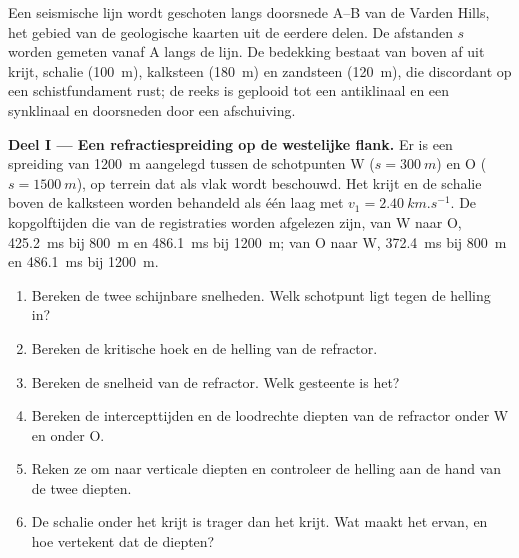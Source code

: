 \begin{problem}
\label{pb:b3:exploration-seismology:1}
Een seismische lijn wordt geschoten langs doorsnede A--B van de Varden Hills, het gebied van
de geologische kaarten uit de eerdere delen. De afstanden $s$ worden gemeten vanaf
A langs de lijn. De bedekking bestaat van boven af uit krijt, schalie (\qty{100}{m}),
kalksteen (\qty{180}{m}) en zandsteen (\qty{120}{m}), die discordant op een
schistfundament rust; de reeks is geplooid tot een antiklinaal en een synklinaal en doorsneden door een
afschuiving.

\medskip
\noindent\textbf{Deel I --- Een refractiespreiding op de westelijke flank.} Er is een spreiding van
\qty{1200}{m} aangelegd tussen de schotpunten W ($s = \qty{300}{m}$) en O
($s = \qty{1500}{m}$), op terrein dat als vlak wordt beschouwd. Het krijt en de schalie boven de
kalksteen worden behandeld als één laag met $v_1 = \qty{2.40}{km.s^{-1}}$. De
kopgolftijden die van de registraties worden afgelezen zijn, van W naar O, \qty{425.2}{ms} bij
\qty{800}{m} en \qty{486.1}{ms} bij \qty{1200}{m}; van O naar W,
\qty{372.4}{ms} bij \qty{800}{m} en \qty{486.1}{ms} bij \qty{1200}{m}.
\begin{enumerate}
  \item Bereken de twee schijnbare snelheden. Welk schotpunt ligt tegen de helling in?
  \item Bereken de kritische hoek en de helling van de refractor.
  \item Bereken de snelheid van de refractor. Welk gesteente is het?
  \item Bereken de intercepttijden en de loodrechte diepten van de
        refractor onder W en onder O.
  \item Reken ze om naar verticale diepten en controleer de helling aan de hand van de twee diepten.
  \item De schalie onder het krijt is trager dan het krijt. Wat maakt het
         ervan, en hoe vertekent dat de diepten?
\end{enumerate}


\end{problem}
